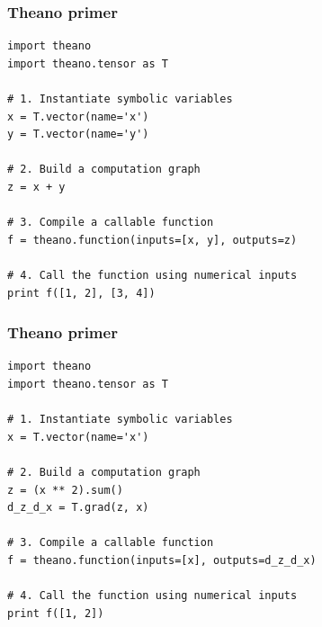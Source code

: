 \documentclass[mathserif, xcolor=dvipsnames]{beamer}
\begin{document}
\begin{frame}[fragile]
    \frametitle{Theano primer}
    \begin{examples}
\begin{lstlisting}[caption=Simple algebra]
import theano
import theano.tensor as T

# 1. Instantiate symbolic variables
x = T.vector(name='x')
y = T.vector(name='y')

# 2. Build a computation graph
z = x + y

# 3. Compile a callable function
f = theano.function(inputs=[x, y], outputs=z)

# 4. Call the function using numerical inputs
print f([1, 2], [3, 4])
\end{lstlisting}
    \end{examples}
\end{frame}

\begin{frame}[fragile]
    \frametitle{Theano primer}
    \begin{examples}
\begin{lstlisting}[caption=Gradient computation]
import theano
import theano.tensor as T

# 1. Instantiate symbolic variables
x = T.vector(name='x')

# 2. Build a computation graph
z = (x ** 2).sum()
d_z_d_x = T.grad(z, x)

# 3. Compile a callable function
f = theano.function(inputs=[x], outputs=d_z_d_x)

# 4. Call the function using numerical inputs
print f([1, 2])
\end{lstlisting}
    \end{examples}
\end{frame}
\end{document}
